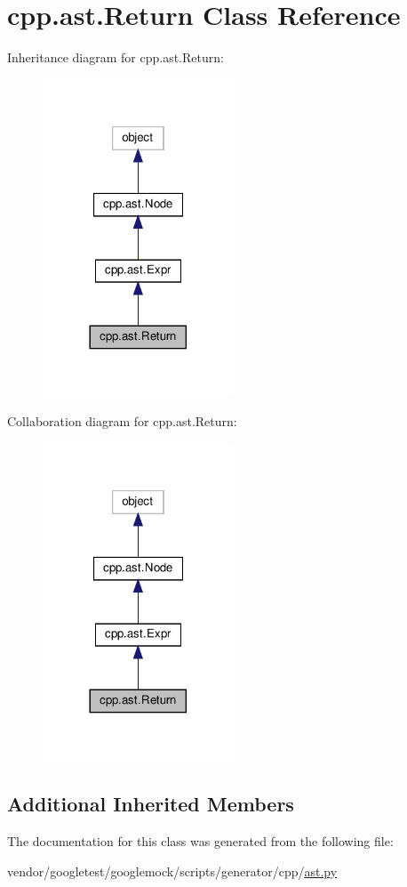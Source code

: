 \hypertarget{classcpp_1_1ast_1_1_return}{}\section{cpp.\+ast.\+Return Class Reference}
\label{classcpp_1_1ast_1_1_return}


Inheritance diagram for cpp.\+ast.\+Return\+:
\nopagebreak
\begin{figure}[H]
\begin{center}
\leavevmode
\includegraphics[width=161pt]{classcpp_1_1ast_1_1_return__inherit__graph}
\end{center}
\end{figure}


Collaboration diagram for cpp.\+ast.\+Return\+:
\nopagebreak
\begin{figure}[H]
\begin{center}
\leavevmode
\includegraphics[width=161pt]{classcpp_1_1ast_1_1_return__coll__graph}
\end{center}
\end{figure}
\subsection*{Additional Inherited Members}


The documentation for this class was generated from the following file\+:\begin{DoxyCompactItemize}
\item 
vendor/googletest/googlemock/scripts/generator/cpp/\hyperlink{ast_8py}{ast.\+py}\end{DoxyCompactItemize}
